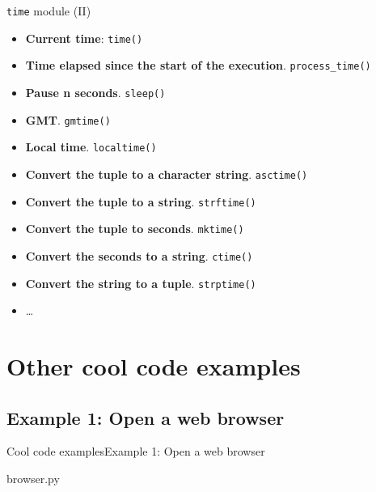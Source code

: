 \documentclass[10pt,compress]{beamer} %
\begin{document}
\begin{frame}{\texttt{time} module (II)}

\begin{block}{}
\footnotesize{
\begin{itemize}			
\item \textbf{Current time}: \texttt{time()}
\item \textbf{Time elapsed since the start of the execution}. \texttt{process\_time()}
\item \textbf{Pause n seconds}. \texttt{sleep()}
\item \textbf{GMT}. \texttt{gmtime()}
\item \textbf{Local time}. \texttt{localtime()}
\item \textbf{Convert the tuple to a character string}. \texttt{asctime()}
\item \textbf{Convert the tuple to a string}. \texttt{strftime()}
\item \textbf{Convert the tuple to seconds}. \texttt{mktime()}
\item \textbf{Convert the seconds to a string}. \texttt{ctime()}
\item \textbf{Convert the string to a tuple}. \texttt{strptime()}
\item \ldots
\end{itemize}
}
\end{block}	
\end{frame}



%	




\section{Other cool code examples}

\subsection{Example 1: Open a web browser}
\begin{frame}{Cool code examples}{Example 1: Open a web browser}
	\vspace{-0.2cm}
	\begin{block}{browser.py}
	\vspace{-0.2cm}
	
	\vspace{-0.2cm}
	\end{block}
\end{frame}
\end{document}
